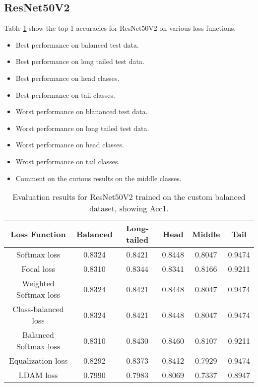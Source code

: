 \subsection{ResNet50V2}

Table \ref{tab:resnet_bal_acc1_1} show the top 1 accuracies for ResNet50V2 on various loss functions.

\begin{itemize}
    \item Best performance on balanced test data.
    \item Best performance on long tailed test data.
    \item Best performance on head classes.
    \item Best performance on tail classes.
    \item Worst performance on blananced test data.
    \item Worst performance on long tailed test data.
    \item Worst performance on head classes.
    \item Wrost performance on tail classes.
    \item Comment on the curious results on the middle classes.
\end{itemize}

\begin{table}[H]
    \centering
    \begin{tabular}{cccccc}
        \toprule
        Loss Function & Balanced & Long-tailed & Head & Middle & Tail \\ 
        \midrule
        Softmax loss   & 0.8324  & 0.8421 & 0.8448 & 0.8047 & 0.9474 \\
        Focal loss   & 0.8310  & 0.8344 & 0.8341 & 0.8166 & 0.9211 \\
        Weighted Softmax loss   & 0.8324 & 0.8421 & 0.8448 & 0.8047 & 0.9474 \\
        Class-balanced loss   &  0.8324 & 0.8421 & 0.8448 & 0.8047 & 0.9474 \\
        Balanced Softmax loss   & 0.8310 & 0.8430 & 0.8460 & 0.8107 & 0.9211 \\
        Equalization loss   & 0.8292 & 0.8373 & 0.8412 & 0.7929 & 0.9474 \\
        LDAM loss   & 0.7990 & 0.7983 & 0.8069 & 0.7337 & 0.8947 \\
        \bottomrule
    \end{tabular}
    \caption{Evaluation results for ResNet50V2 trained on the custom balanced dataset, showing Acc1.}
    \label{tab:resnet_bal_acc1_1}
\end{table}

